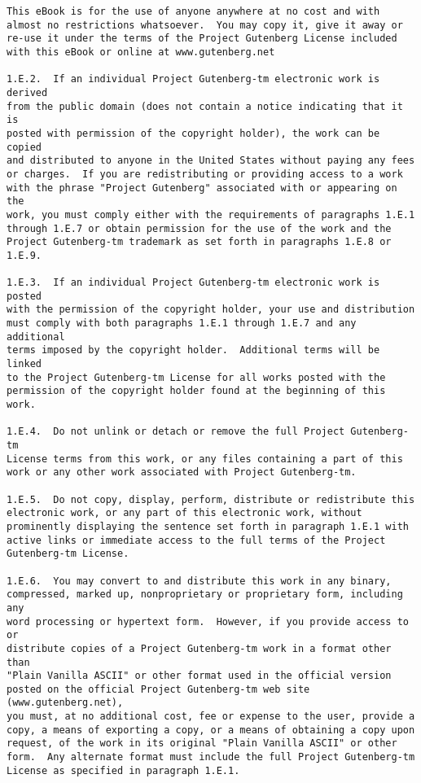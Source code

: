 \begin{Verbatim}[fontsize=\footnotesize]
This eBook is for the use of anyone anywhere at no cost and with
almost no restrictions whatsoever.  You may copy it, give it away or
re-use it under the terms of the Project Gutenberg License included
with this eBook or online at www.gutenberg.net

1.E.2.  If an individual Project Gutenberg-tm electronic work is derived
from the public domain (does not contain a notice indicating that it is
posted with permission of the copyright holder), the work can be copied
and distributed to anyone in the United States without paying any fees
or charges.  If you are redistributing or providing access to a work
with the phrase "Project Gutenberg" associated with or appearing on the
work, you must comply either with the requirements of paragraphs 1.E.1
through 1.E.7 or obtain permission for the use of the work and the
Project Gutenberg-tm trademark as set forth in paragraphs 1.E.8 or
1.E.9.

1.E.3.  If an individual Project Gutenberg-tm electronic work is posted
with the permission of the copyright holder, your use and distribution
must comply with both paragraphs 1.E.1 through 1.E.7 and any additional
terms imposed by the copyright holder.  Additional terms will be linked
to the Project Gutenberg-tm License for all works posted with the
permission of the copyright holder found at the beginning of this work.

1.E.4.  Do not unlink or detach or remove the full Project Gutenberg-tm
License terms from this work, or any files containing a part of this
work or any other work associated with Project Gutenberg-tm.

1.E.5.  Do not copy, display, perform, distribute or redistribute this
electronic work, or any part of this electronic work, without
prominently displaying the sentence set forth in paragraph 1.E.1 with
active links or immediate access to the full terms of the Project
Gutenberg-tm License.

1.E.6.  You may convert to and distribute this work in any binary,
compressed, marked up, nonproprietary or proprietary form, including any
word processing or hypertext form.  However, if you provide access to or
distribute copies of a Project Gutenberg-tm work in a format other than
"Plain Vanilla ASCII" or other format used in the official version
posted on the official Project Gutenberg-tm web site (www.gutenberg.net),
you must, at no additional cost, fee or expense to the user, provide a
copy, a means of exporting a copy, or a means of obtaining a copy upon
request, of the work in its original "Plain Vanilla ASCII" or other
form.  Any alternate format must include the full Project Gutenberg-tm
License as specified in paragraph 1.E.1.


\end{Verbatim}
